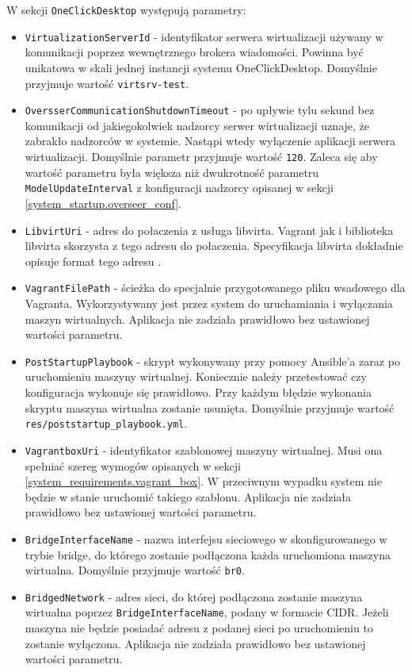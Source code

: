 \documentclass[../opis-rozwiazania.tex]{subfiles}
\begin{document}
W sekcji \texttt{OneClickDesktop} występują parametry:
\begin{itemize}
	\item \texttt{VirtualizationServerId} - identyfikator serwera wirtualizacji używany w komunikacji poprzez wewnętrznego brokera wiadomości. Powinna być unikatowa w skali jednej instancji systemu OneClickDesktop. Domyślnie przyjmuje wartość \texttt{virtsrv-test}.
	\item \texttt{OversserCommunicationShutdownTimeout} - po upływie tylu sekund bez komunikacji od jakiegokolwiek nadzorcy serwer wirtualizacji uznaje, że zabrakło nadzorców w systemie. Nastąpi wtedy wyłączenie aplikacji serwera wirtualizacji. Domyślnie parametr przyjmuje wartość \texttt{120}. Zaleca się aby wartość parametru była większa niż dwukrotność parametru \texttt{ModelUpdateInterval} z konfiguracji nadzorcy opisanej w sekcji \ref{system_startup.overseer_conf}.
	\item \texttt{LibvirtUri} - adres do połaczenia z usługa libvirta. Vagrant jak i biblioteka libvirta skorzysta z tego adresu do połaczenia. Specyfikacja libvirta dokładnie opisuje format tego adresu \parencite{libvirt-uri}.
	\item \texttt{VagrantFilePath} - ścieżka do specjalnie przygotowanego pliku wsadowego dla Vagranta. Wykorzystywany jest przez system do uruchamiania i wyłączania maszyn wirtualnych. Aplikacja nie zadziała prawidłowo bez ustawionej wartości parametru.
	\item \texttt{PostStartupPlaybook} - skrypt wykonywany przy pomocy Ansible'a zaraz po uruchomieniu maszyny wirtualnej. Koniecznie należy przetestować czy konfiguracja wykonuje się prawidłowo. Przy każdym błędzie wykonania skryptu maszyna wirtualna zostanie usunięta. Domyślnie przyjmuje wartość \texttt{res/poststartup\_playbook.yml}.
	\item \texttt{VagrantboxUri} - identyfikator szablonowej maszyny wirtualnej. Musi ona spełniać szereg wymogów opisanych w sekcji \ref{system_requirements.vagrant_box}. W przeciwnym wypadku system nie będzie w stanie uruchomić takiego szablonu. Aplikacja nie zadziała prawidłowo bez ustawionej wartości parametru.
	\item \texttt{BridgeInterfaceName} - nazwa interfejsu sieciowego w skonfigurowanego w trybie bridge, do którego zostanie podłączona każda uruchomiona maszyna wirtualna. Domyślnie przyjmuje wartość \texttt{br0}.
	\item \texttt{BridgedNetwork} - adres sieci, do której podłączona zostanie maszyna wirtualna poprzez \texttt{BridgeInterfaceName}, podany w formacie CIDR. Jeżeli maszyna nie będzie posiadać adresu z podanej sieci po uruchomieniu to zostanie wyłączona. Aplikacja nie zadziała prawidłowo bez ustawionej wartości parametru.

\end{itemize}
\end{document}
